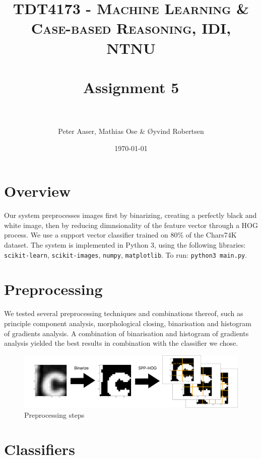 \documentclass[paper=a4, fontsize=11pt]{scrartcl} %
\title{	
    \normalfont \normalsize 
    \textsc{TDT4173 - Machine Learning \& Case-based Reasoning, IDI, NTNU} \\ [25pt] %
    \horrule{0.5pt} \\[0.4cm] %
    \huge Assignment 5 \\ %
    \horrule{2pt} \\[0.5cm] %
}
\author{Peter Aaser, Mathias Ose \& Øyvind Robertsen} %
\date{\normalsize\today} %
\numberwithin{equation}{section} %
\numberwithin{figure}{section} %
\numberwithin{table}{section} %
\begin{document}
\maketitle %



\section{Overview}

Our system preprocesses images first by binarizing, creating a perfectly black and white image, then by reducing dimnsionality of the feature vector through a HOG process.
We use a support vector classifier trained on 80\% of the Chars74K dataset.
The system is implemented in Python 3, using the following libraries: \texttt{scikit-learn}, \texttt{scikit-images}, \texttt{numpy}, \texttt{matplotlib}.
To run: \texttt{python3 main.py}.

\section{Preprocessing}

We tested several preprocessing techniques and combinations thereof, such as principle component analysis, morphological closing, binarisation and histogram of gradients analysis.
A combination of binarisation and histogram of gradients analysis yielded the best results in combination with the classifier we chose.


\begin{figure}[H]
    \centering
    \includegraphics[width=0.8\linewidth]{img/preprocessing.pdf}
    \caption{Preprocessing steps} \label{fig:preprocessing}
\end{figure}

\section{Classifiers}
\end{document}
